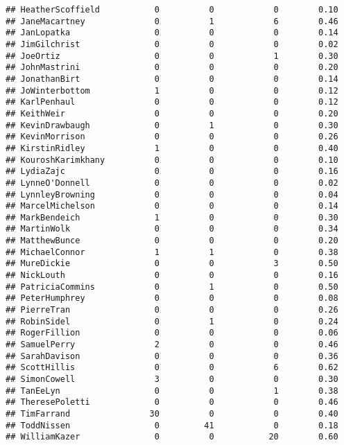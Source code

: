 \documentclass[
  12pt,
]{article}
\begin{document}
\begin{verbatim}
## HeatherScoffield           0          0            0        0.10
## JaneMacartney              0          1            6        0.46
## JanLopatka                 0          0            0        0.14
## JimGilchrist               0          0            0        0.02
## JoeOrtiz                   0          0            1        0.30
## JohnMastrini               0          0            0        0.20
## JonathanBirt               0          0            0        0.14
## JoWinterbottom             1          0            0        0.12
## KarlPenhaul                0          0            0        0.12
## KeithWeir                  0          0            0        0.20
## KevinDrawbaugh             0          1            0        0.30
## KevinMorrison              0          0            0        0.26
## KirstinRidley              1          0            0        0.40
## KouroshKarimkhany          0          0            0        0.10
## LydiaZajc                  0          0            0        0.16
## LynneO'Donnell             0          0            0        0.02
## LynnleyBrowning            0          0            0        0.04
## MarcelMichelson            0          0            0        0.14
## MarkBendeich               1          0            0        0.30
## MartinWolk                 0          0            0        0.34
## MatthewBunce               0          0            0        0.20
## MichaelConnor              1          1            0        0.38
## MureDickie                 0          0            3        0.50
## NickLouth                  0          0            0        0.16
## PatriciaCommins            0          1            0        0.50
## PeterHumphrey              0          0            0        0.08
## PierreTran                 0          0            0        0.26
## RobinSidel                 0          1            0        0.24
## RogerFillion               0          0            0        0.06
## SamuelPerry                2          0            0        0.46
## SarahDavison               0          0            0        0.36
## ScottHillis                0          0            6        0.62
## SimonCowell                3          0            0        0.30
## TanEeLyn                   0          0            1        0.38
## TheresePoletti             0          0            0        0.46
## TimFarrand                30          0            0        0.40
## ToddNissen                 0         41            0        0.18
## WilliamKazer               0          0           20        0.60
\end{verbatim}
\end{document}

